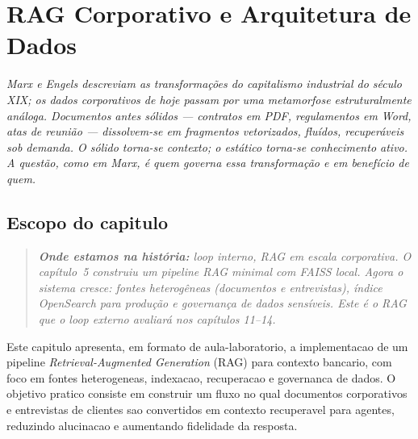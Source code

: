 \chapter{RAG Corporativo e Arquitetura de Dados}
\label{chap:rag_corporativo}


{\small\itshape\color{AccentGray}
Marx e Engels descreviam as transforma\c{c}\~oes do capitalismo industrial do s\'{e}culo XIX; os dados corporativos de hoje passam por uma metamorfose estruturalmente an\'{a}loga. Documentos antes s\'{o}lidos --- contratos em PDF, regulamentos em Word, atas de reuni\~ao --- dissolvem-se em fragmentos vetorizados, flu\'{i}dos, recuper\'{a}veis sob demanda. O s\'{o}lido torna-se contexto; o est\'{a}tico torna-se conhecimento ativo. A quest\~ao, como em Marx, \'{e} quem governa essa transforma\c{c}\~ao e em benef\'{i}cio de quem.\par}
\vspace{0.6em}

\section{Escopo do capitulo}

\begin{quote}\itshape
\textbf{Onde estamos na hist\'oria:} loop interno, RAG em escala corporativa.
O cap\'itulo~5 construiu um pipeline RAG minimal com FAISS local.
Agora o sistema cresce: fontes heterog\^eneas (documentos e entrevistas),
\'indice OpenSearch para produ\c{c}\~ao e governan\c{c}a de dados
sens\'iveis. Este \'e o RAG que o loop externo
avaliar\'a nos cap\'itulos 11--14.
\end{quote}

Este capitulo apresenta, em formato de aula-laboratorio, a implementacao de
um pipeline \textit{Retrieval-Augmented Generation} (RAG)
para contexto bancario, com foco em fontes heterogeneas,
indexacao, recuperacao
e governanca de dados. O objetivo pratico consiste em construir um fluxo no
qual documentos corporativos e entrevistas de clientes sao convertidos em
contexto recuperavel para agentes, reduzindo alucinacao e aumentando
fidelidade da resposta.

